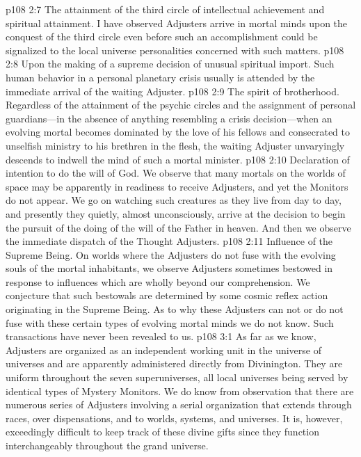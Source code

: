 \pc \vs p108 2:7 \bibnobreakspace The attainment of the third circle of intellectual achievement and spiritual attainment. I have observed Adjusters arrive in mortal minds upon the conquest of the third circle even before such an accomplishment could be signalized to the local universe personalities concerned with such matters.
\pc \vs p108 2:8 \bibnobreakspace Upon the making of a supreme decision of unusual spiritual import. Such human behavior in a personal planetary crisis usually is attended by the immediate arrival of the waiting Adjuster.
\pc \vs p108 2:9 \bibnobreakspace The spirit of brotherhood. Regardless of the attainment of the psychic circles and the assignment of personal guardians---in the absence of anything resembling a crisis decision---when an evolving mortal becomes dominated by the love of his fellows and consecrated to unselfish ministry to his brethren in the flesh, the waiting Adjuster unvaryingly descends to indwell the mind of such a mortal minister.
\pc \vs p108 2:10 \bibnobreakspace Declaration of intention to do the will of God. We observe that many mortals on the worlds of space may be apparently in readiness to receive Adjusters, and yet the Monitors do not appear. We go on watching such creatures as they live from day to day, and presently they quietly, almost unconsciously, arrive at the decision to begin the pursuit of the doing of the will of the Father in heaven. And then we observe the immediate dispatch of the Thought Adjusters.
\pc \vs p108 2:11 \bibnobreakspace Influence of the Supreme Being. On worlds where the Adjusters do not fuse with the evolving souls of the mortal inhabitants, we observe Adjusters sometimes bestowed in response to influences which are wholly beyond our comprehension. We conjecture that such bestowals are determined by some cosmic reflex action originating in the Supreme Being. As to why these Adjusters can not or do not fuse with these certain types of evolving mortal minds we do not know. Such transactions have never been revealed to us.
\vs p108 3:1 As far as we know, Adjusters are organized as an independent working unit in the universe of universes and are apparently administered directly from Divinington. They are uniform throughout the seven superuniverses, all local universes being served by identical types of Mystery Monitors. We do know from observation that there are numerous series of Adjusters involving a serial organization that extends through races, over dispensations, and to worlds, systems, and universes. It is, however, exceedingly difficult to keep track of these divine gifts since they function interchangeably throughout the grand universe.
